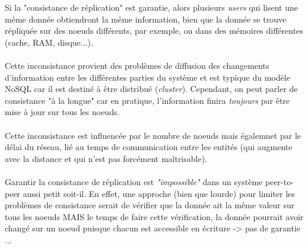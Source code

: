 \item{}
{\vrai}
{
Si la "consistance de réplication" est garantie, alors plusieurs \textit{users} qui lisent une même donnée obtiendront la même information, bien que la donnée se trouve répliquée sur des noeuds différents, par exemple, ou dans des mémoires différentes (cache, RAM, disque...).
\paragraph{}
Cette inconsistance provient des problèmes de diffusion des changements d'information entre les différentes parties du système et est typique du modèle NoSQL car il est destiné à être distribué (\textit{cluster}). Cependant, on peut parler de consistance "à la longue" car en pratique, l'information finira \textit{toujours} par être mise à jour sur tous les noeuds.
\paragraph{}
Cette inconsistance est influencée par le nombre de noeuds mais égalemnet par le délai du réseau, lié au temps de communication entre les entités (qui augmente avec la distance et qui n'est pas forcément maîtrisable).
\paragraph{}
Garantir la consistance de réplication est \textit{"impossible"} dans un système peer-to-peer aussi petit soit-il. En effet, une approche (bien que lourde) pour limiter les problèmes de consistance serait de vérifier que la donnée ait la même valeur sur tous les noeuds MAIS le temps de faire cette vérification, la donnée pourrait avoir changé sur un noeud puisque chacun est accessible en écriture -> pas de garantie ... 
}


